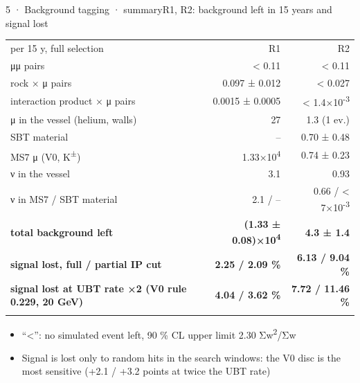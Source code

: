 \begin{btframe}{5 · Background tagging · summary}{R1, R2: background left in 15 years and signal lost}
{\fontsize{5.31pt}{6.90pt}\selectfont\setlength{\tabcolsep}{3.72pt}\renewcommand{\arraystretch}{1.42}
\begin{tabularx}{\linewidth}{>{\raggedright\arraybackslash}Xrr}
\textcolor{muted}{per 15 y, full selection} & \textcolor{muted}{R1} & \textcolor{muted}{R2} \\\headrule
μμ pairs & < 0.11 & < 0.11 \\\rowrule
rock × μ pairs & 0.097 ± 0.012 & < 0.027 \\\rowrule
interaction product × μ pairs & 0.0015 ± 0.0005 & < 1.4×10\textsuperscript{-3} \\\rowrule
μ in the vessel (helium, walls) & 27 & 1.3 (1 ev.) \\\rowrule
SBT material & – & 0.70 ± 0.48 \\\rowrule
MS7 μ (V0, K\textsuperscript{±}) & 1.33×10\textsuperscript{4} & 0.74 ± 0.23 \\\rowrule
ν in the vessel & 3.1 & 0.93 \\\rowrule
ν in MS7 / SBT material & 2.1 / – & 0.66 / < 7×10\textsuperscript{-3} \\\rowrule
\rowcolor{tint}\bfseries total background left & \bfseries (1.33 ± 0.08)×10\textsuperscript{4} & \bfseries 4.3 ± 1.4 \\\rowrule
\rowcolor{tint}\bfseries signal lost, full / partial IP cut & \bfseries 2.25 / 2.09 \% & \bfseries 6.13 / 9.04 \% \\\rowrule
\rowcolor{tint}\bfseries signal lost at UBT rate ×2 (V0 rule 0.229, 20 GeV) & \bfseries 4.04 / 3.62 \% & \bfseries 7.72 / 11.46 \% \\\rowrule
\end{tabularx}\par}
\vspace{2.46pt}
{\fontsize{6.15pt}{8.60pt}\selectfont
\begin{itemize}
  \item “<”: no simulated event left, 90 \% CL upper limit 2.30 Σw\textsuperscript{2}/Σw
  \item Signal is lost only to random hits in the search windows: the V0 disc is the most sensitive (+2.1 / +3.2 points at twice the UBT rate)
\end{itemize}}
\end{btframe}

